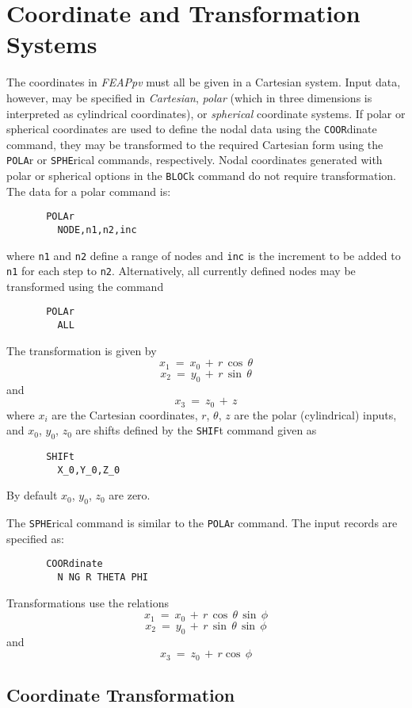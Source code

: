 \section{Coordinate and Transformation Systems}
\label{transform}

The coordinates in {\sl FEAPpv} must all be given in a Cartesian system.
Input data, however, may be specified in {\it Cartesian}, {\it polar}
(which in three dimensions is interpreted as cylindrical coordinates),
or {\it spherical} coordinate systems.  If polar or spherical coordinates
are used to define the nodal data using the {\tt COOR}\-dinate command,
they may be transformed to the required
Cartesian form using the {\tt POLA}r or {\tt SPHE}rical commands, respectively.
Nodal coordinates generated with polar or spherical options in the {\tt BLOC}k
command do not require transformation. 
The data for a polar command is:
\begin{verbatim}
       POLAr
         NODE,n1,n2,inc
\end{verbatim}
\par\noindent
where {\tt n1} and {\tt n2} define a range of nodes and {\tt inc} is
the increment to be added to {\tt n1} for each step to {\tt n2}.  Alternatively,
all currently defined nodes may be transformed using the command
\begin{verbatim}
       POLAr
         ALL
\end{verbatim}
\par\noindent
The transformation is given by
$$ x_1 ~=~ x_0 \, + \, r \, \cos \, \theta$$
$$ x_2 ~=~ y_0 \, + \, r \, \sin \, \theta$$
and
$$ x_3 ~=~ z_0 \, + \, z$$
where $x_i$ are the Cartesian coordinates, $r$, $\theta$, $z$ are the
polar (cylindrical) inputs, and $x_0$, $y_0$, $z_0$ are shifts defined
by the {\tt SHIF}t command given as
\begin{verbatim}
       SHIFt
         X_0,Y_0,Z_0
\end{verbatim}
By default $x_0$, $y_0$, $z_0$ are zero.

The {\tt SPHE}rical command is similar to the {\tt POLA}r command.  The
input records are specified as:
\begin{verbatim}
       COORdinate
         N NG R THETA PHI
\end{verbatim}
Transformations use the relations
$$ x_1 ~=~ x_0 \, + \, r \, \cos \, \theta \, \sin \, \phi$$
$$ x_2 ~=~ y_0 \, + \, r \, \sin \, \theta \, \sin \, \phi$$
and
$$ x_3 ~=~ z_0 \, + \, r \cos \, \phi$$

\subsection{Coordinate Transformation}

